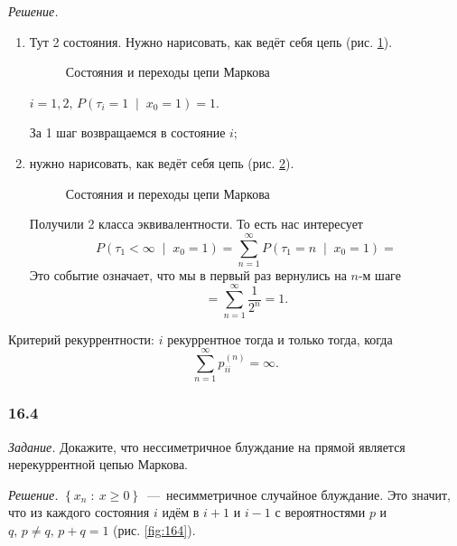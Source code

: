 \textit{Решение.}
\begin{enumerate}[label=\alph*)]
  \item Тут 2 состояния.
  Нужно нарисовать, как ведёт себя цепь (рис. \ref{fig:162}).

  \begin{figure}[h]
    \centering
    
    \caption{Состояния и переходы цепи Маркова}
    \label{fig:162}
  \end{figure}

  $i = 1, 2, \, P \left( \tau_i = 1 \; \middle| \; x_0 = 1 \right) = 1$.

  За 1 шаг возвращаемся в состояние $i$;
  \item нужно нарисовать, как ведёт себя цепь (рис. \ref{fig:1621}).

  \begin{figure}[h]
    \centering
    
    \caption{Состояния и переходы цепи Маркова}
    \label{fig:1621}
  \end{figure}

  Получили 2 класса эквивалентности.
  То есть нас интересует
  \begin{equation*}
    P \left( \tau_1 < \infty \; \middle| \; x_0 = 1 \right) =
    \sum \limits_{n = 1}^{ \infty }
      P \left( \tau_1 = n \; \middle| \; x_0 = 1 \right) =
  \end{equation*}
  Это событие означает, что мы в первый раз вернулись на $n$-м шаге
  \begin{equation*}
    = \sum \limits_{n = 1}^{ \infty } \frac{1}{2^n} =
    1.
  \end{equation*}
\end{enumerate}

Критерий рекуррентности: $i$ рекуррентное тогда и только тогда, когда
\begin{equation*}
  \sum \limits_{n = 1}^{ \infty } p_{ii}^{ \left( n \right) } =
  \infty.
\end{equation*}

\subsubsection*{16.4}

\textit{Задание.}
Докажите,
что нессиметричное блуждание на прямой является нерекуррентной цепью Маркова.

\textit{Решение.}
$ \left\{ x_n \; : \: x \geq 0 \right\} $~---~несимметричное случайное
блуждание.
Это значит, что из каждого состояния $i$ идём в $i + 1$ и $i - 1$
с вероятностями $p$ и $q, \, p \neq q, \, p + q = 1$ (рис. \ref{fig:164}).

